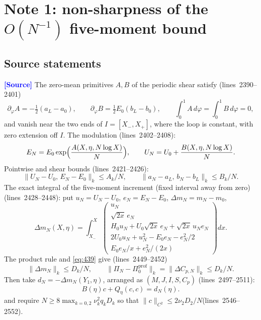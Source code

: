 \documentclass[11pt,a4paper]{article}
\theoremstyle{definition}
\theoremstyle{remark}
\newcommand{\lnos}[1]{(lines~#1)}
\newcommand{\ORIG}{\textcolor{blue}{\textbf{[Source]}}}
\begin{document}
\section{Note 1: non-sharpness of the \texorpdfstring{$O(N^{-1})$}{O(N\textasciicircum -1)} five-moment bound}
\label{sec:note1}

\subsection{Source statements}
\label{sec:note1-orig}

\ORIG
The zero-mean primitives $A,B$ of the periodic shear satisfy \lnos{2390--2401}
\begin{equation}
\label{eq:AB}
\partial_\varphi A=-\tfrac12(a_L-a_0),\qquad
\partial_\varphi B=\tfrac12 E_0(b_L-b_0),\qquad
\int_0^1 A\,d\varphi=\int_0^1 B\,d\varphi=0,
\end{equation}
and vanish near the two ends of $I=[X_-,X_+]$, where the loop is constant, with zero extension off $I$.
The modulation \lnos{2402--2408}:
\begin{equation}
\label{eq:438}
E_N=E_0\exp\Bigl(\frac{A(X,\eta,N\log X)}{N}\Bigr),\qquad
U_N=U_0+\frac{B(X,\eta,N\log X)}{N}.
\end{equation}
Pointwise and shear bounds \lnos{2421--2426}:
\begin{equation}
\label{eq:439}
\|U_N-U_0,\,E_N-E_0\|_k\le A_k/N,\qquad
\|a_N-a_L,\,b_N-b_L\|_k\le B_k/N.
\end{equation}
The exact integral of the five-moment increment (fixed interval away from zero) \lnos{2428--2448}:
put $u_N=U_N-U_0$, $e_N=E_N-E_0$, $\Delta m_N=m_N-m_0$,
\begin{equation}
\label{eq:Dm}
\Delta m_N(X,\eta)
=\int_{X_-}^{X}
\begin{pmatrix}
u_N \\
\sqrt{2x}\,e_N \\
H_0 u_N+U_0\sqrt{2x}\,e_N+\sqrt{2x}\,u_N e_N \\
2U_0 u_N+u_N^2-E_0 e_N-e_N^2/2 \\
E_0 e_N/x+e_N^2/(2x)
\end{pmatrix}
dx.
\end{equation}
The product rule and \eqref{eq:439} give \lnos{2449--2452}
\begin{equation}
\label{eq:Dm-orig}
\|\Delta m_N\|_k\le D_k/N,\qquad
\|\Pi_N-\Pi_0^{\mathrm{prof}}\|_k=\|\Delta C_{p,N}\|_k\le D_k/N.
\end{equation}
Then take $d_N=-\Delta m_N(Y_1,\eta)$, arranged as $(M,J,I,S,C_p)$ \lnos{2497--2511}:
\begin{equation}
\label{eq:442}
B(\eta)c+Q_\eta(c,c)=d_N(\eta).
\end{equation}
and require $N\ge 8\max_{k=0,2}\nu_k^2 q_k D_k$
so that $\|c\|_{C^2}\le 2\nu_2 D_2/N$\lnos{2546--2552}.
\end{document}
